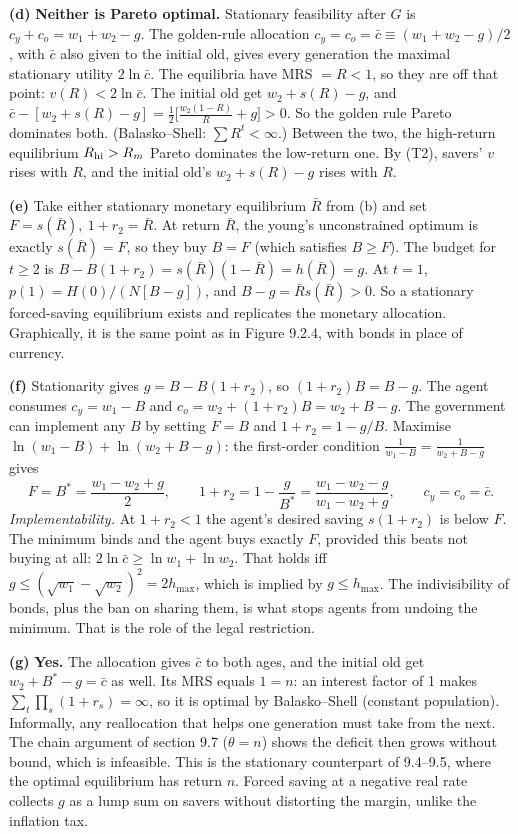 \documentclass[12pt, letterpaper]{article}
\begin{document}
\begin{tcolorbox}[oddbox,title={Exercise 9.13 \quad Bryant--Keynes--Wallace}]
\textbf{(d)} \textbf{Neither is Pareto optimal.} Stationary feasibility after $G$ is
$c_y+c_o=w_1+w_2-g$. The golden-rule allocation $c_y=c_o=\bar c\equiv(w_1+w_2-g)/2$, with $\bar c$
also given to the initial old, gives every generation the maximal stationary utility $2\ln\bar c$.
The equilibria have MRS $=R<1$, so they are off that point: $v(R)<2\ln\bar c$. The initial old get
$w_2+s(R)-g$, and $\bar c-[w_2+s(R)-g]=\frac12\big[\frac{w_2(1-R)}R+g\big]>0$. So the golden rule
Pareto dominates both. (Balasko--Shell: $\sum R^t<\infty$.) Between the two, the high-return
equilibrium $R_{\rm hi}>R_m$ Pareto dominates the low-return one. By (T2), savers' $v$ rises with $R$,
and the initial old's $w_2+s(R)-g$ rises with $R$.

\textbf{(e)} Take either stationary monetary equilibrium $\bar R$ from (b) and set
$\boxed{F=s(\bar R),\ 1+r_2=\bar R}$. At return $\bar R$, the young's unconstrained optimum is exactly
$s(\bar R)=F$, so they buy $B=F$ (which satisfies $B\ge F$). The budget for $t\ge2$ is
$B-B(1+r_2)=s(\bar R)(1-\bar R)=h(\bar R)=g$. At $t=1$, $p(1)=H(0)/(N[B-g])$, and $B-g=\bar
Rs(\bar R)>0$. So a stationary forced-saving equilibrium exists and replicates the monetary
allocation. Graphically, it is the same point as in Figure 9.2.4, with bonds in place of currency.

\textbf{(f)} Stationarity gives $g=B-B(1+r_2)$, so $(1+r_2)B=B-g$. The agent consumes
$c_y=w_1-B$ and $c_o=w_2+(1+r_2)B=w_2+B-g$. The government can implement any $B$ by setting $F=B$ and
$1+r_2=1-g/B$. Maximise $\ln(w_1-B)+\ln(w_2+B-g)$: the first-order condition
$\frac1{w_1-B}=\frac1{w_2+B-g}$ gives
\[
\boxed{F=B^*=\frac{w_1-w_2+g}2,\qquad 1+r_2=1-\frac g{B^*}=\frac{w_1-w_2-g}{w_1-w_2+g}},\qquad c_y=c_o=\bar c .
\]
\emph{Implementability.} At $1+r_2<1$ the agent's desired saving $s(1+r_2)$ is below $F$. The minimum
binds and the agent buys exactly $F$, provided this beats not buying at all:
$2\ln\bar c\ge\ln w_1+\ln w_2$. That holds iff $g\le(\sqrt{w_1}-\sqrt{w_2})^2=2h_{\max}$, which is
implied by $g\le h_{\max}$. The indivisibility of bonds, plus the ban on sharing them, is what stops
agents from undoing the minimum. That is the role of the legal restriction.

\textbf{(g)} \textbf{Yes.} The allocation gives $\bar c$ to both ages, and the initial old get
$w_2+B^*-g=\bar c$ as well. Its MRS equals $1=n$: an interest factor of 1 makes
$\sum_t\prod_s(1+r_s)=\infty$, so it is optimal by Balasko--Shell (constant population). Informally,
any reallocation that helps one generation must take from the next. The chain argument of section 9.7
($\theta=n$) shows the deficit then grows without bound, which is infeasible. This is the stationary
counterpart of 9.4--9.5, where the optimal equilibrium has return $n$. Forced saving at a negative
real rate collects $g$ as a lump sum on savers without distorting the margin, unlike the inflation
tax.


\end{tcolorbox}
\end{document}

